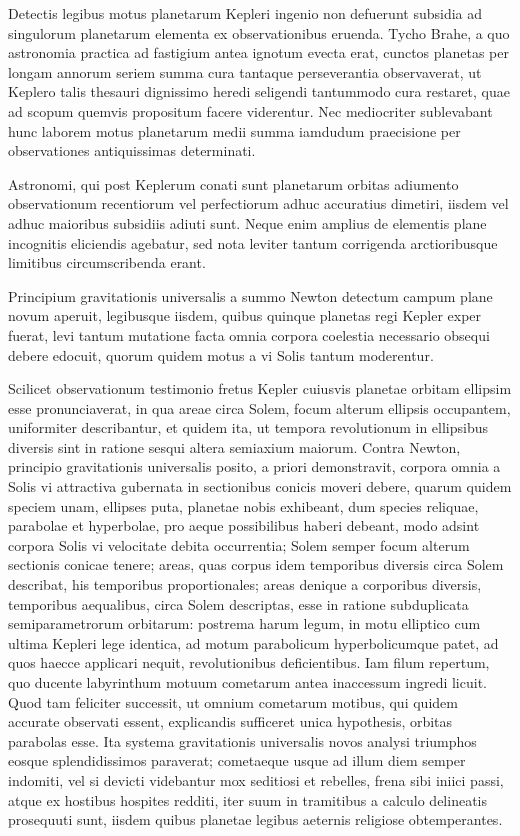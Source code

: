 \documentclass[12pt,a4paper]{book}
\begin{document}
Detectis legibus motus planetarum Kepleri ingenio non defuerunt subsidia ad singulorum planetarum elementa ex observationibus eruenda. Tycho Brahe, a quo astronomia practica ad fastigium antea ignotum evecta erat, cunctos planetas per longam annorum seriem summa cura tantaque perseverantia observaverat, ut Keplero talis thesauri dignissimo heredi seligendi tantummodo cura restaret, quae ad scopum quemvis propositum facere viderentur. Nec mediocriter sublevabant hunc laborem motus planetarum medii summa iamdudum praecisione per observationes antiquissimas determinati.

Astronomi, qui post Keplerum conati sunt planetarum orbitas adiumento observationum recentiorum vel perfectiorum adhuc accuratius dimetiri, iisdem vel adhuc maioribus subsidiis adiuti sunt. Neque enim amplius de elementis plane incognitis eliciendis agebatur, sed nota leviter tantum corrigenda arctioribusque limitibus circumscribenda erant.

Principium gravitationis universalis a summo Newton detectum campum plane novum aperuit, legibusque iisdem, quibus quinque planetas regi Kepler exper fuerat, levi tantum mutatione facta omnia corpora coelestia necessario obsequi debere edocuit, quorum quidem motus a vi Solis tantum moderentur.

Scilicet observationum testimonio fretus Kepler cuiusvis planetae orbitam ellipsim esse pronunciaverat, in qua areae circa Solem, focum alterum ellipsis occupantem, uniformiter describantur, et quidem ita, ut tempora revolutionum in ellipsibus diversis sint in ratione sesqui altera semiaxium maiorum. Contra Newton, principio gravitationis universalis posito, a priori demonstravit, corpora omnia a Solis vi attractiva gubernata in sectionibus conicis moveri debere, quarum quidem speciem unam, ellipses puta, planetae nobis exhibeant, dum species reliquae, parabolae et hyperbolae, pro aeque possibilibus haberi debeant, modo adsint corpora Solis vi velocitate debita occurrentia; Solem semper focum alterum sectionis conicae tenere; areas, quas corpus idem temporibus diversis circa Solem describat, his temporibus proportionales; areas denique a corporibus diversis, temporibus aequalibus, circa Solem descriptas, esse in ratione subduplicata semiparametrorum orbitarum: postrema harum legum, in motu elliptico cum ultima Kepleri lege identica, ad motum parabolicum hyperbolicumque patet, ad quos haecce applicari nequit, revolutionibus deficientibus. Iam filum repertum, quo ducente labyrinthum motuum cometarum antea inaccessum ingredi licuit. Quod tam feliciter successit, ut omnium cometarum motibus, qui quidem accurate observati essent, explicandis sufficeret unica hypothesis, orbitas parabolas esse. Ita systema gravitationis universalis novos analysi triumphos eosque splendidissimos paraverat; cometaeque usque ad illum diem semper indomiti, vel si devicti videbantur mox seditiosi et rebelles, frena sibi iniici passi, atque ex hostibus hospites redditi, iter suum in tramitibus a calculo delineatis prosequuti sunt, iisdem quibus planetae legibus aeternis religiose obtemperantes.
\end{document}

